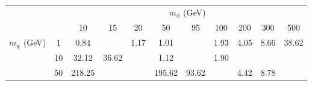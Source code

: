 \begin{tabular}{cc|ccccccccc} 
 & & \multicolumn{9}{c}{$m_\phi$ (GeV)} \\ 
& &10 & 15 & 20 & 50 & 95 & 100 & 200 & 300 & 500\\ 
 \hline \hline 
\multirow{3}{*}{$m_\chi$ (GeV)} & 1 & 0.84 &  & 1.17 & 1.01 &  & 1.93 & 4.05 & 8.66 & 38.62\\ 
 & 10 & 32.12 & 36.62 &  & 1.12 &  & 1.90 &  &  & \\ 
 & 50 & 218.25 &  &  & 195.62 & 93.62 &  & 4.42 & 8.78 & \\ 
 \end{tabular}